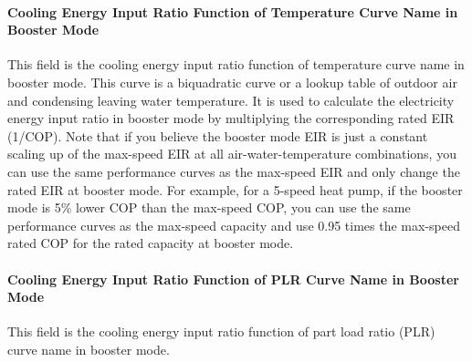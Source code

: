 \paragraph{Cooling Energy Input Ratio Function of Temperature Curve Name in
Booster Mode} This field is the cooling energy input ratio function of
temperature curve name in booster mode. This curve is a biquadratic curve or a
lookup table of outdoor air and condensing leaving water temperature. It is used
to calculate the electricity energy input ratio in booster mode by multiplying
the corresponding rated EIR (1/COP). Note that if you believe the booster mode
EIR is just a constant scaling up of the max-speed EIR at all
air-water-temperature combinations, you can use the same performance curves as
the max-speed EIR and only change the rated EIR at booster mode.
For example, for a 5-speed heat pump, if the booster mode is 5\% lower COP
than the max-speed COP, you can use the same performance curves as the max-speed
capacity and use 0.95 times the max-speed rated COP for the rated capacity at booster mode.
\paragraph{Cooling Energy Input Ratio Function of PLR Curve Name in Booster
Mode} This field is the cooling energy input ratio function of part load ratio
(PLR) curve name in booster mode.


